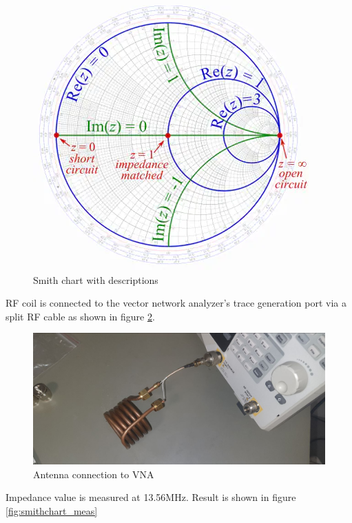 \begin{figure}
    \centering
    \includegraphics{fig/smithchart_ex.png}
    \caption{Smith chart with descriptions}
    \label{fig:smith_ex}
\end{figure}
\newpage
RF coil is connected to the vector network analyzer's trace generation port via a split RF cable as shown in figure \ref{fig:antenna_meas}.

\begin{figure}[ht]
    \centering
    \includegraphics[scale=0.3,angle=90]{fig/antenna_meas.jpeg}
    \caption{Antenna connection to VNA}
    \label{fig:antenna_meas}
\end{figure}

Impedance value is measured at 13.56MHz. Result is shown in figure \ref{fig:smithchart_meas}

